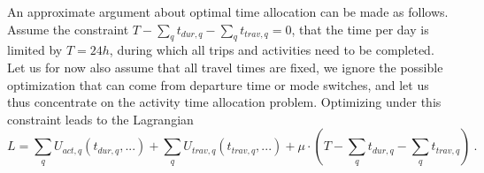 An approximate argument about optimal time allocation can be made as follows.
Assume the constraint
$T - \sum_q t_{dur,q} - \sum_q t_{trav,q} = 0$, \ie that the time per day is limited by $T = 24h$, during which all trips and activities need to be completed.
%
%
%
Let us for now also assume that all travel times are fixed, \ie we ignore the possible optimization that can come from departure time or mode switches, and let us thus concentrate on the activity time allocation problem.
%
Optimizing under 
this constraint leads to the Lagrangian
\begin{equation}
L = \sum_q U_{act,q}(t_{dur,q}, ...) + \sum_q U_{trav,q}(t_{trav,q}, ...)
%
%
+ \mu \cdot (T - \sum_q t_{dur,q} - \sum_q t_{trav,q})  \ .
\label{eq:lagrangian}
\end{equation}

